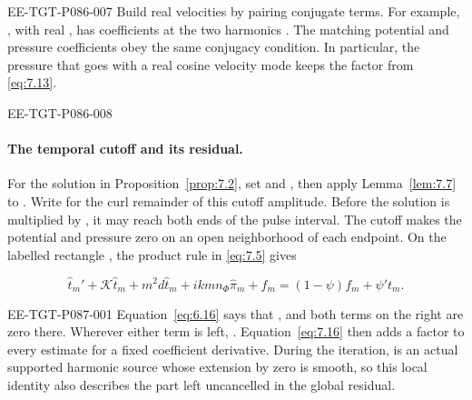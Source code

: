\begin{EESegment}{EE-TGT-P086-007}
Build real velocities by pairing conjugate terms. For example,
, with real , has coefficients
 at the two harmonics . The matching
potential and pressure coefficients obey the same conjugacy condition. In particular, the pressure
that goes with a real cosine velocity mode keeps the factor  from
\eqref{eq:7.13}.
\end{EESegment}

\begin{EESegment}{EE-TGT-P086-008}
\paragraph{The temporal cutoff and its residual.}
For the solution in Proposition~\ref{prop:7.2}, set
 and
, then apply Lemma~\ref{lem:7.7} to
. Write  for the curl
remainder of this cutoff amplitude. Before the solution is multiplied by
, it may reach both ends of the pulse interval. The cutoff makes the
potential and pressure zero on an open neighborhood of each endpoint. On the labelled rectangle
%
, the product rule in \eqref{eq:7.5} gives
\end{EESegment}
\begin{equation}
  \widehat t_m'+\mathcal K\widehat t_m+m^2d\widehat t_m
  +ikm n_\Phi\widehat\pi_m+f_m
  =(1-\psi)f_m+\psi't_m.
\tag{7.40}\label{eq:7.40}
\end{equation}
\begin{EESegment}{EE-TGT-P087-001}
Equation~\eqref{eq:6.16} says that
, and both terms on the right are zero
there. Wherever either term is left, . Equation~\eqref{eq:7.16}
then adds a factor  to every estimate for a fixed coefficient
derivative. During the iteration,  is an actual supported
harmonic source whose extension by zero is smooth, so this local identity also describes the part
left uncancelled in the global residual.
\end{EESegment}

